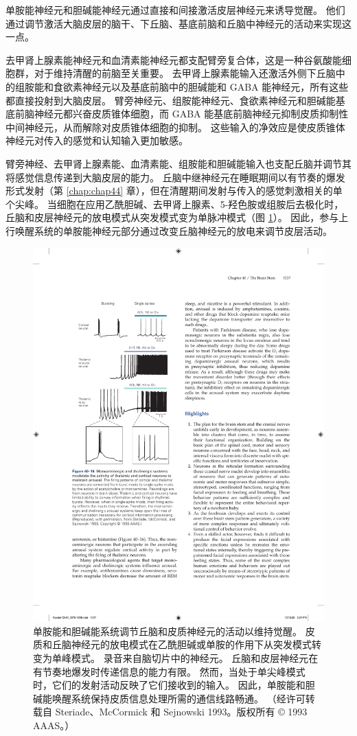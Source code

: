 单胺能神经元和胆碱能神经元通过直接和间接激活皮层神经元来诱导觉醒。 他们通过调节激活大脑皮层的脑干、下丘脑、基底前脑和丘脑中神经元的活动来实现这一点。

去甲肾上腺素能神经元和血清素能神经元都支配臂旁复合体，这是一种谷氨酸能细胞群，对于维持清醒的前脑至关重要。 去甲肾上腺素能输入还激活外侧下丘脑中的组胺能和食欲素神经元以及基底前脑中的胆碱能和 GABA 能神经元，所有这些都直接投射到大脑皮层。 臂旁神经元、组胺能神经元、食欲素神经元和胆碱能基底前脑神经元都兴奋皮质锥体细胞，而 GABA 能基底前脑神经元抑制皮质抑制性中间神经元，从而解除对皮质锥体细胞的抑制。 这些输入的净效应是使皮质锥体神经元对传入的感觉和认知输入更加敏感。

臂旁神经、去甲肾上腺素能、血清素能、组胺能和胆碱能输入也支配丘脑并调节其将感觉信息传递到大脑皮层的能力。 丘脑中继神经元在睡眠期间以有节奏的爆发形式发射（第 \ref{chap:chap44} 章），但在清醒期间发射与传入的感觉刺激相关的单个尖峰。 
当细胞在应用乙酰胆碱、去甲肾上腺素、5-羟色胺或组胺后去极化时，丘脑和皮层神经元的放电模式从突发模式变为单脉冲模式（图 \ref{fig:40_16}）。 
因此，参与上行唤醒系统的单胺能神经元部分通过改变丘脑神经元的放电来调节皮层活动。


\begin{figure}[htbp]
	\centering
	\includegraphics[width=0.45\linewidth]{chap40/fig_40_16}
	\caption{单胺能和胆碱能系统调节丘脑和皮质神经元的活动以维持觉醒。 皮质和丘脑神经元的放电模式在乙酰胆碱或单胺的作用下从突发模式转变为单峰模式。 录音来自脑切片中的神经元。 丘脑和皮层神经元在有节奏地爆发时传递信息的能力有限。 然而，当处于单尖峰模式时，它们的发射活动反映了它们接收到的输入。 因此，单胺能和胆碱能唤醒系统保持皮质信息处理所需的通信线路畅通。 （经许可转载自 Steriade、McCormick 和 Sejnowski 1993。版权所有 © 1993 AAAS。）}
	\label{fig:40_16}
\end{figure}

